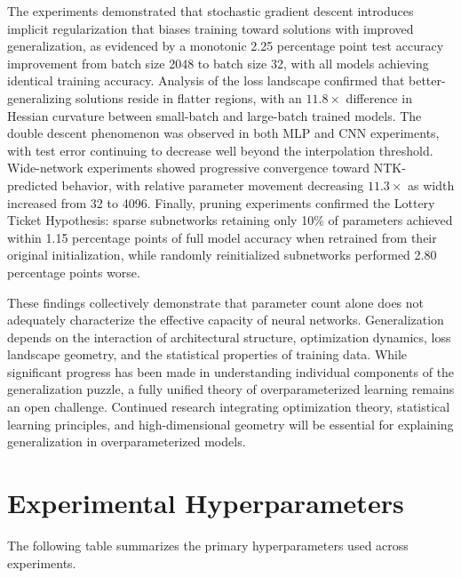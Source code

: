 \documentclass[conference]{IEEEtran}
\begin{document}
The experiments demonstrated that stochastic gradient descent introduces implicit regularization that biases training toward solutions with improved generalization, as evidenced by a monotonic 2.25 percentage point test accuracy improvement from batch size 2048 to batch size 32, with all models achieving identical training accuracy. Analysis of the loss landscape confirmed that better-generalizing solutions reside in flatter regions, with an $11.8\times$ difference in Hessian curvature between small-batch and large-batch trained models. The double descent phenomenon was observed in both MLP and CNN experiments, with test error continuing to decrease well beyond the interpolation threshold. Wide-network experiments showed progressive convergence toward NTK-predicted behavior, with relative parameter movement decreasing $11.3\times$ as width increased from 32 to 4096. Finally, pruning experiments confirmed the Lottery Ticket Hypothesis: sparse subnetworks retaining only 10\% of parameters achieved within 1.15 percentage points of full model accuracy when retrained from their original initialization, while randomly reinitialized subnetworks performed 2.80 percentage points worse.

These findings collectively demonstrate that parameter count alone does not adequately characterize the effective capacity of neural networks. Generalization depends on the interaction of architectural structure, optimization dynamics, loss landscape geometry, and the statistical properties of training data. While significant progress has been made in understanding individual components of the generalization puzzle, a fully unified theory of overparameterized learning remains an open challenge. Continued research integrating optimization theory, statistical learning principles, and high-dimensional geometry will be essential for explaining generalization in overparameterized models.




\appendix

\section{Experimental Hyperparameters}

The following table summarizes the primary hyperparameters used across experiments.
\end{document}
